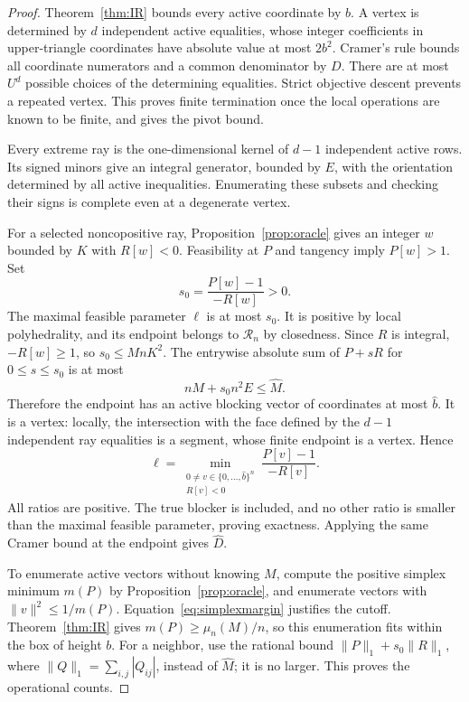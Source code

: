 \documentclass[11pt]{article}
\theoremstyle{remark}\newtheorem{remark}[theorem]{Remark}
\newcommand{\Ry}{\mathcal R}
\newcommand{\norm}[1]{\lVert#1\rVert}
\begin{document}
\begin{proof}
Theorem~\ref{thm:IR} bounds every active coordinate by $b$. A vertex is determined by $d$ independent active equalities, whose integer coefficients in upper-triangle coordinates have absolute value at most $2b^2$. Cramer's rule bounds all coordinate numerators and a common denominator by $D$. There are at most $U^d$ possible choices of the determining equalities. Strict objective descent prevents a repeated vertex. This proves finite termination once the local operations are known to be finite, and gives the pivot bound.

Every extreme ray is the one-dimensional kernel of $d-1$ independent active rows. Its signed minors give an integral generator, bounded by $E$, with the orientation determined by all active inequalities. Enumerating these subsets and checking their signs is complete even at a degenerate vertex.

For a selected noncopositive ray, Proposition~\ref{prop:oracle} gives an integer $w$ bounded by $K$ with $R[w]<0$. Feasibility at $P$ and tangency imply $P[w]>1$. Set
\begin{equation}\label{eq:s0}
 s_0=\frac{P[w]-1}{-R[w]}>0.
\end{equation}
The maximal feasible parameter $\ell$ is at most $s_0$. It is positive by local polyhedrality, and its endpoint belongs to $\Ry_n$ by closedness. Since $R$ is integral, $-R[w]\ge1$, so $s_0\le MnK^2$. The entrywise absolute sum of $P+sR$ for $0\le s\le s_0$ is at most
\[
 nM+s_0 n^2 E\le\widehat M.
\]
Therefore the endpoint has an active blocking vector of coordinates at most $\widehat b$. It is a vertex: locally, the intersection with the face defined by the $d-1$ independent ray equalities is a segment, whose finite endpoint is a vertex. Hence
\begin{equation}\label{eq:neighbor}
 \ell=\min_{\substack{0\ne v\in\{0,\ldots,\widehat b\}^n\\ R[v]<0}}
             \frac{P[v]-1}{-R[v]}.
\end{equation}
All ratios are positive. The true blocker is included, and no other ratio is smaller than the maximal feasible parameter, proving exactness. Applying the same Cramer bound at the endpoint gives $\widehat D$.

To enumerate active vectors without knowing $M$, compute the positive simplex minimum $m(P)$ by Proposition~\ref{prop:oracle}, and enumerate vectors with $\norm v^2\le1/m(P)$. Equation~\eqref{eq:simplexmargin} justifies the cutoff. Theorem~\ref{thm:IR} gives $m(P)\ge\mu_n(M)/n$, so this enumeration fits within the box of height $b$. For a neighbor, use the rational bound $\norm P_1+s_0\norm R_1$, where $\norm Q_1=\sum_{i,j}|Q_{ij}|$, instead of $\widehat M$; it is no larger. This proves the operational counts.


\end{proof}
\end{document}
